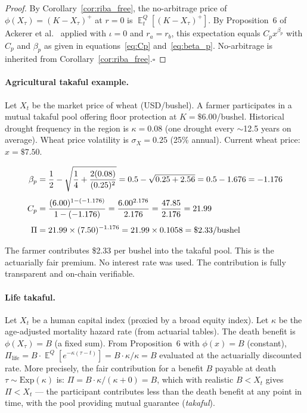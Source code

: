 \documentclass[10pt,twocolumn]{article}
\theoremstyle{plain}
\theoremstyle{definition}
\DeclareMathOperator{\E}{\mathbb{E}}
\begin{document}
\begin{proof}
By Corollary~\ref{cor:riba_free}, the no-arbitrage price of
$\phi(X_\tau) = (K-X_\tau)^+$ at $r=0$ is $\E^Q_t[(K-X_\tau)^+]$.
By Proposition~6 of Ackerer et al.\ \cite{Ackerer2024} applied
with $\iota = 0$ and $r_a = r_b$, this expectation equals
$C_p x^{\beta_p}$ with $C_p$ and $\beta_p$ as given in
equations~\eqref{eq:Cp} and~\eqref{eq:beta_p}. No-arbitrage
is inherited from Corollary~\ref{cor:riba_free}.\qquad$\square$
\end{proof}

\paragraph{Agricultural takaful example.}
Let $X_t$ be the market price of wheat (USD/bushel). A farmer
participates in a mutual takaful pool offering floor protection
at $K = \$6.00$/bushel. Historical drought frequency in the
region is $\kappa = 0.08$ (one drought every $\sim$12.5 years
on average). Wheat price volatility is $\sigma_X = 0.25$
(25\% annual). Current wheat price: $x = \$7.50$.

\begin{align}
\beta_p &= \frac{1}{2} - \sqrt{\frac{1}{4}
+ \frac{2(0.08)}{(0.25)^2}}
= 0.5 - \sqrt{0.25 + 2.56} = 0.5 - 1.676 = -1.176
\notag\\[4pt]
C_p &= \frac{(6.00)^{1-(-1.176)}}{1-(-1.176)}
= \frac{6.00^{2.176}}{2.176}
= \frac{47.85}{2.176} = 21.99
\notag\\[4pt]
\Pi &= 21.99 \times (7.50)^{-1.176}
= 21.99 \times 0.1058 = \$2.33\text{/bushel}
\label{eq:agri_example}
\end{align}

The farmer contributes \$2.33 per bushel into the takaful pool.
This is the actuarially fair premium. No interest rate was used.
The contribution is fully transparent and on-chain verifiable.

\paragraph{Life takaful.}
Let $X_t$ be a human capital index (proxied by a broad equity
index). Let $\kappa$ be the age-adjusted mortality hazard rate
(from actuarial tables). The death benefit is $\phi(X_\tau) = B$
(a fixed sum). From Proposition~6 with $\phi(x) = B$ (constant),
$\Pi_\mathrm{life} = B \cdot \E^Q[e^{-\kappa(\tau-t)}] =
B \cdot \kappa/\kappa = B$ evaluated at the actuarially discounted
rate. More precisely, the fair contribution for a benefit $B$
payable at death $\tau \sim \mathrm{Exp}(\kappa)$ is:
$\Pi = B \cdot \kappa / (\kappa + 0) = B$, which with realistic
$B < X_t$ gives $\Pi < X_t$ --- the participant contributes
less than the death benefit at any point in time, with the
pool providing mutual guarantee (\textit{takaful}).
\end{document}
